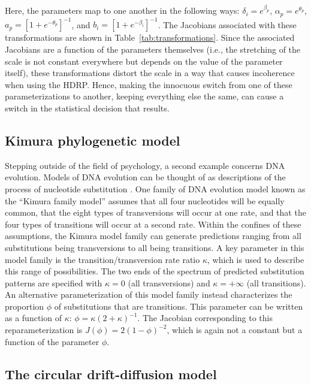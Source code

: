 \documentclass[9pt,twocolumn,twoside]{cidlab-draft}\templatetype{cidlab-invited}
\newcommand{\hdr}{HDRP}
\begin{document}
Here, the parameters map to one another in the following ways: $\delta_i = e^{\beta_p}$, $\alpha_p = e^{\theta_p}$, $a_p      = \left[1+e^{-\theta_p}\right]^{-1}$, and $b_i = \left[1+e^{-\beta_i}\right]^{-1}$.
The Jacobians associated with these transformations are shown in Table~\ref{tab:transformations}.  Since the associated Jacobians are a function of the parameters themselves (i.e., the stretching of the scale is not constant everywhere but depends on the value of the parameter itself), these transformations distort the scale in a way that causes incoherence when using the \hdr{}.  Hence, making the innocuous switch from one of these parameterizations to another, keeping everything else the same, can cause a switch in the statistical decision that results.

\subsection*{Kimura phylogenetic model}

Stepping outside of the field of psychology, a second example concerns DNA evolution.  Models of DNA evolution can be thought of as descriptions of the process of nucleotide substitution \cite{Zwickl2004}. One family of DNA evolution model known as the ``Kimura family model'' assumes that  all four nucleotides will be equally common, that the eight types of transversions will occur at one rate, and that the four types of transitions will occur at a second rate. Within the confines of these assumptions, the Kimura model family can generate predictions ranging from all substitutions being transversions to all being transitions.  A key parameter in this model family is the transition/transversion rate ratio $\kappa$, which is used to describe this range of possibilities. The two ends of the spectrum of predicted substitution patterns are specified with $\kappa = 0$ (all transversions) and $\kappa = +\infty$ (all transitions).  An alternative parameterization of this model family instead characterizes the proportion $\phi$ of substitutions that are transitions.  This parameter can be written as a function of $\kappa$: $\phi = \kappa (2 + \kappa)^{-1}$.  The Jacobian corresponding to this reparameterization is $J(\phi) = 2(1 - \phi)^{-2}$, which is again not a constant but a function of the parameter $\phi$.

\subsection*{The circular drift-diffusion model}
\end{document}
